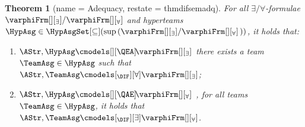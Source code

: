 \documentclass[authoryear]{elsarticle}
\newtheorem{theorem}{Theorem}
\begin{document}
\begin{theorem}[name = \DIF Adequacy, restate = thmdifsemadq]
  \label{thm:difsemadq}
  For all $\exists/\forall$-\DIF formulae
  $\varphiFrm[][_{\exists}]/\varphiFrm[][_{\forall}]$ and hyperteams $\HypAsg
  \in \HypAsgSet[\subseteq](\sup{}(
  \varphiFrm[][_{\exists}]/\varphiFrm[][_{\forall}]\, ))$, it holds that:
  \begin{enumerate}[1)]
    \item\label{thm:difsemadq(ea)}
      $\AStr, \HypAsg \cmodels[][\QEA]\! \varphiFrm[][_{\exists}]$ \iff there
      exists a team $\TeamAsg \in \HypAsg$ such that $\AStr, \TeamAsg
      \cmodels[_{\DIF}][\forall] \varphiFrm[][_{\exists}]$;
    \item\label{thm:difsemadq(ae)}
      $\AStr, \HypAsg \cmodels[][\QAE]\! \varphiFrm[][_{\forall}]$ \iff, for all
      teams $\TeamAsg \in \HypAsg$, it holds that $\AStr, \TeamAsg
      \cmodels[_{\DIF}][\exists] \varphiFrm[][_{\forall}]$.
  \end{enumerate}
\end{theorem}
\end{document}
